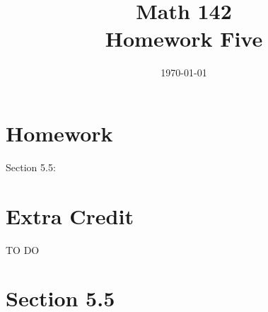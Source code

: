 \documentclass{exam}
\author{}
\date{\today}
\title{Math 142 \\ Homework Five}
\begin{document}
  \maketitle

  \section{Homework}
  Section 5.5: 

  \section{Extra Credit}
  TO DO

  \ifprintanswers

    \pagebreak

    \section{Section 5.5}
\end{document}
